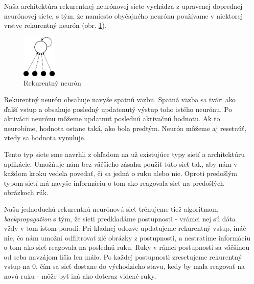 Naša architektúra rekurentnej neurónovej siete vychádza z upravenej doprednej neurónovej siete, s tým, že namiesto obyčajného neurónu používame v niektorej vrstve rekurentný neurón (obr. \ref{fig:recurentneuron}). 

\begin{figure}[htbp]
  \begin{center}
    \includegraphics[width=0.15\textwidth]{images/recneuron}
  \end{center}
  \caption{Rekurentný neurón}
  \label{fig:recurentneuron}
\end{figure}

Rekurentný neurón obsahuje navyše spätnú väzbu. Spätná väzba sa tvári ako ďalší vstup a obsahuje posledný updatenutý výstup toho istého neurónu. Po aktivácii neurónu môžeme updatnuť poslednú aktivačnú hodnotu. Ak to neurobíme, hodnota ostane taká, ako bola predtým. Neurón môžeme aj resetnúť, vtedy sa hodnota vynuluje.

Tento typ siete sme navrhli z ohľadom na už existujúce typy sietí a architektúru aplikácie. Umožňuje nám bez väčšieho zásahu použiť túto sieť tak, aby nám v každom kroku vedela povedať, či sa jedná o ruku alebo nie. Oproti predošlým typom sietí má navyše informáciu o tom ako reagovala sieť na predošlých obrázkoch rúk.

Našu jednoduchú rekurentnú neurónovú sieť trénujeme tiež algoritmom \textit{backpropagation} s tým, že sieti predkladáme postupnosti - vrámci nej sú dáta vždy v tom istom poradí. Pri kladnej odozve updatujeme rekurentný vstup, ináč nie, čo nám umožní odfiltrovať zlé obrázky z postupnosti, a nestratíme informáciu o tom ako sieť reagovala na poslednú ruku. Ruky v rámci postupnosti sa väčšinou od seba navzájom líšia len málo. Po každej postupnosti zresetujeme rekurentný vstup na 0, čím sa sieť dostane do východzieho stavu, kedy by mala reagovať na novú ruku - môže byť iná ako doteraz videné ruky.